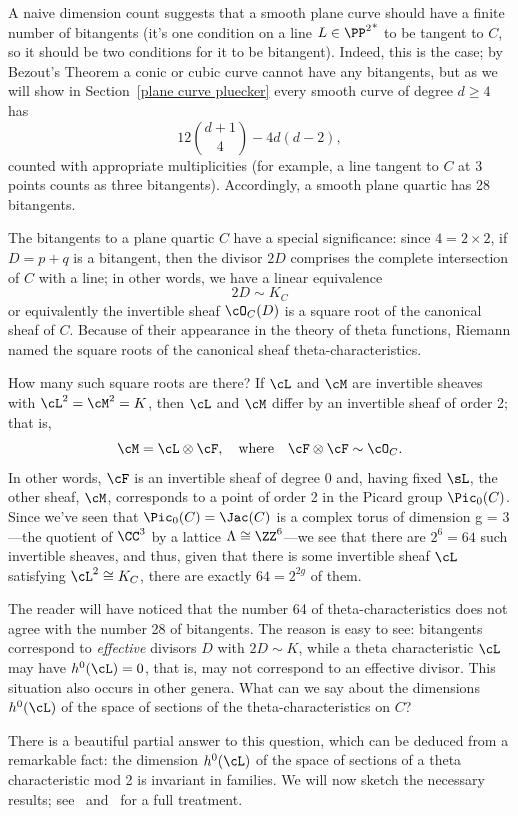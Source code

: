 A naive dimension count suggests that a smooth plane curve should have a finite number of bitangents (it's one condition on a line $L \in {\PP^2}^*$ to be tangent to $C$, so it should be two conditions for it to be bitangent). Indeed, this is the case; by Bezout's Theorem a conic or cubic curve cannot have any bitangents, but as we will show in Section~\ref{plane curve pluecker} every smooth curve of degree $d \geq 4$ has 
$$
12\binom{d+1}{4} - 4d(d-2),
$$
counted with appropriate multiplicities (for example, a line tangent to $C$ at 3 points  counts as three bitangents). Accordingly, a smooth plane quartic has 28 bitangents.

The bitangents to a plane quartic $C$ have a special significance: since $4 = 2 \times 2$, if $D = p+q$ is a bitangent, then the divisor $2D$ comprises the complete intersection of $C$ with a line; in other words, we have a linear equivalence
$$
2D \sim K_C
$$
or equivalently the invertible sheaf $\cO_C(D)$ is a square root of the canonical sheaf of $C$. Because of their appearance in the theory of theta functions, Riemann named the square roots of the canonical sheaf theta-characteristics.

How many such square roots are there? If $\cL$ and $\cM$ are invertible sheaves with $\cL^2 = \cM^2 = K$, then $\cL$ and $\cM$ differ by an invertible sheaf of order 2; that is,
$$
\cM = \cL \otimes \cF, \quad \text{where} \quad \cF \otimes \cF \sim \cO_C.
$$
In other words, $\cF$ is an invertible sheaf of degree 0 and, having fixed $\sL$,  the other sheaf, $\cM$, corresponds to a point of order 2 in the Picard group $\Pic_0(C)$. Since we've seen that $\Pic_0(C) = \Jac(C)$ is a complex torus of dimension g = 3---the quotient of $\CC^3$ by a lattice $\Lambda \cong \ZZ^6$---we see that there are $2^6 = 64$ such invertible sheaves, and thus, given that there is some invertible sheaf $\cL$ satisfying $\cL^2 \cong K_C$, there are exactly $64 = 2^{2g}$ of them.

  
The reader will have noticed that the number 64 of theta-characteristics does not agree with the number 28 of bitangents. The reason is easy to see: bitangents correspond to \emph{effective} divisors $D$ with $2D \sim K$, while a theta characteristic $\cL$ may have $h^0(\cL) = 0$, that is, may not correspond to an effective divisor. 
This situation also occurs in other genera. 
What can we say about the dimensions $h^0(\cL)$ of the space of sections of the theta-characteristics on $C$?
 
 There is a beautiful partial answer to this question, which can be deduced from a remarkable fact: the dimension $h^0(\cL)$ of the space of sections of a theta characteristic mod 2 is invariant in families.
We will now
sketch the necessary results; see~\cite{MumfordPaper} and~\cite{JHPaper} for a full treatment.

